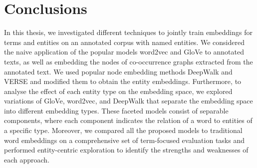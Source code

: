 \chapter{Conclusions}\label{chap:concl}
In this thesis, we investigated different techniques to jointly train embeddings for terms and entities on an annotated corpus with named entities. We considered the naive application of the popular models word2vec and GloVe to annotated texts, as well as embedding the nodes of co-occurrence graphs extracted from the annotated text. We used popular node embedding methods DeepWalk and VERSE and modified them to obtain the entity embeddings. Furthermore, to analyse the effect of each entity type on the embedding space, we explored variations of GloVe, word2vec, and DeepWalk that separate the embedding space into different embedding types. These faceted models consist of separable components, where each component indicates the relation of a word to entities of a specific type. Moreover, we compared all the proposed models to traditional word embeddings on a comprehensive set of term-focused evaluation tasks and performed entity-centric exploration to identify the strengths and weaknesses of each approach. 
